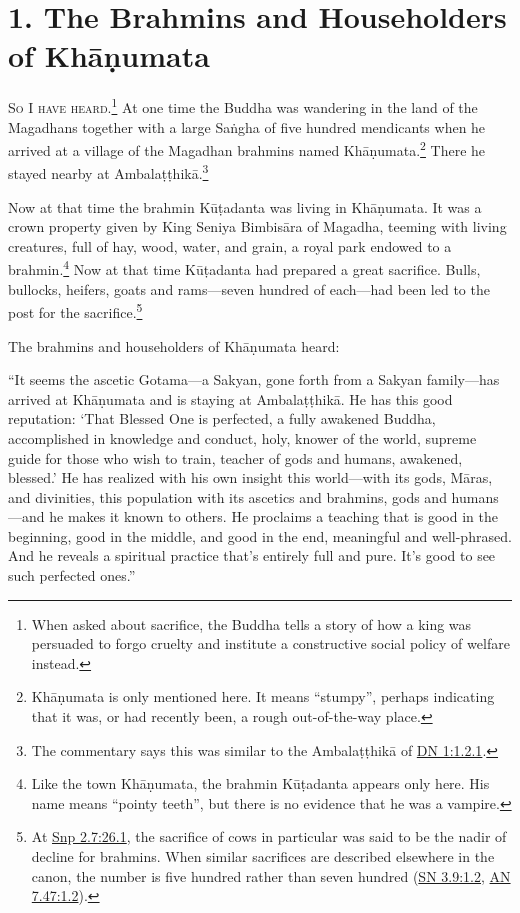 \documentclass[12pt,openany]{book}%
\newcommand*{\scevam}[1]{\textsc{#1}}
\begin{document}
\section*{1. The Brahmins and Householders of \textsanskrit{Khāṇumata} }

\scevam{So I have heard.\footnote{When asked about sacrifice, the Buddha tells a story of how a king was persuaded to forgo cruelty and institute a constructive social policy of welfare instead. } }At one time the Buddha was wandering in the land of the Magadhans together with a large \textsanskrit{Saṅgha} of five hundred mendicants when he arrived at a village of the Magadhan brahmins named \textsanskrit{Khāṇumata}.\footnote{\textsanskrit{Khāṇumata} is only mentioned here. It means “stumpy”, perhaps indicating that it was, or had recently been, a rough out-of-the-way place. } There he stayed nearby at \textsanskrit{Ambalaṭṭhikā}.\footnote{The commentary says this was similar to the \textsanskrit{Ambalaṭṭhikā} of \href{https://suttacentral.net/dn1/en/sujato\#1.2.1}{DN 1:1.2.1}. } 

Now at that time the brahmin \textsanskrit{Kūṭadanta} was living in \textsanskrit{Khāṇumata}. It was a crown property given by King Seniya \textsanskrit{Bimbisāra} of Magadha, teeming with living creatures, full of hay, wood, water, and grain, a royal park endowed to a brahmin.\footnote{Like the town \textsanskrit{Khāṇumata}, the brahmin \textsanskrit{Kūṭadanta} appears only here. His name means “pointy teeth”, but there is no evidence that he was a vampire. } Now at that time \textsanskrit{Kūṭadanta} had prepared a great sacrifice. Bulls, bullocks, heifers, goats and rams—seven hundred of each—had been led to the post for the sacrifice.\footnote{At \href{https://suttacentral.net/snp2.7/en/sujato\#26.1}{Snp 2.7:26.1}, the sacrifice of cows in particular was said to be the nadir of decline for brahmins. When similar sacrifices are described elsewhere in the canon, the number is five hundred rather than seven hundred (\href{https://suttacentral.net/sn3.9/en/sujato\#1.2}{SN 3.9:1.2}, \href{https://suttacentral.net/an7.47/en/sujato\#1.2}{AN 7.47:1.2}). } 

The brahmins and householders of \textsanskrit{Khāṇumata} heard: 

“It seems the ascetic Gotama—a Sakyan, gone forth from a Sakyan family—has arrived at \textsanskrit{Khāṇumata} and is staying at \textsanskrit{Ambalaṭṭhikā}. He has this good reputation: ‘That Blessed One is perfected, a fully awakened Buddha, accomplished in knowledge and conduct, holy, knower of the world, supreme guide for those who wish to train, teacher of gods and humans, awakened, blessed.’ He has realized with his own insight this world—with its gods, \textsanskrit{Māras}, and divinities, this population with its ascetics and brahmins, gods and humans—and he makes it known to others. He proclaims a teaching that is good in the beginning, good in the middle, and good in the end, meaningful and well-phrased. And he reveals a spiritual practice that’s entirely full and pure. It’s good to see such perfected ones.” 
\end{document}
